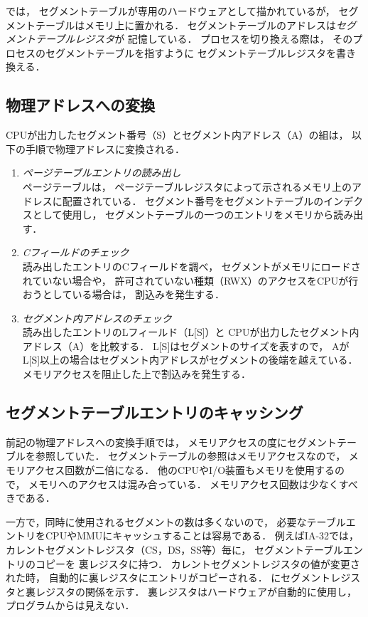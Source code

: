 では，
セグメントテーブルが専用のハードウェアとして描かれているが，
セグメントテーブルはメモリ上に置かれる．
セグメントテーブルのアドレスは\emph{セグメントテーブルレジスタ}が
記憶している．
プロセスを切り換える際は，
そのプロセスのセグメントテーブルを指すように
セグメントテーブルレジスタを書き換える．

\subsection{物理アドレスへの変換}
CPUが出力したセグメント番号（S）とセグメント内アドレス（A）の組は，
以下の手順で物理アドレスに変換される．

\begin{enumerate}
\item \emph{ページテーブルエントリの読み出し}\\
ページテーブルは，
ページテーブルレジスタによって示されるメモリ上のアドレスに配置されている．
セグメント番号をセグメントテーブルのインデクスとして使用し，
セグメントテーブルの一つのエントリをメモリから読み出す．

\item \emph{Cフィールドのチェック}\\
読み出したエントリのCフィールドを調べ，
セグメントがメモリにロードされていない場合や，
許可されていない種類（RWX）のアクセスをCPUが行おうとしている場合は，
割込みを発生する．

\item \emph{セグメント内アドレスのチェック}\\
読み出したエントリのLフィールド（L[S]）と
CPUが出力したセグメント内アドレス（A）を比較する．
L[S]はセグメントのサイズを表すので，
AがL[S]以上の場合はセグメント内アドレスがセグメントの後端を越えている．
メモリアクセスを阻止した上で割込みを発生する．
\end{enumerate}

\subsection{セグメントテーブルエントリのキャッシング}
前記の物理アドレスへの変換手順では，
メモリアクセスの度にセグメントテーブルを参照していた．
セグメントテーブルの参照はメモリアクセスなので，
メモリアクセス回数が二倍になる．
他のCPUやI/O装置もメモリを使用するので，
メモリへのアクセスは混み合っている．
メモリアクセス回数は少なくすべきである．

一方で，同時に使用されるセグメントの数は多くないので，
必要なテーブルエントリをCPUやMMUにキャッシュすることは容易である．
例えばIA-32では，
カレントセグメントレジスタ（CS，DS，SS等）毎に，
セグメントテーブルエントリのコピーを
裏レジスタ\cite{ia32SegmentHiddenReg}に持つ．
カレントセグメントレジスタの値が変更された時，
自動的に裏レジスタにエントリがコピーされる．
にセグメントレジスタと裏レジスタの関係を示す．
裏レジスタはハードウェアが自動的に使用し，
プログラムからは見えない．

